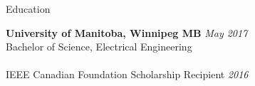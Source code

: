 \documentclass{resume} %
\begin{document}

\begin{rSection}{Education}

{\bf University of Manitoba, Winnipeg MB} \hfill {\em May 2017} 
\\ Bachelor of Science, Electrical Engineering
\\
\\IEEE Canadian Foundation Scholarship Recipient \hfill {\em 2016}

\end{rSection}
\end{document}
